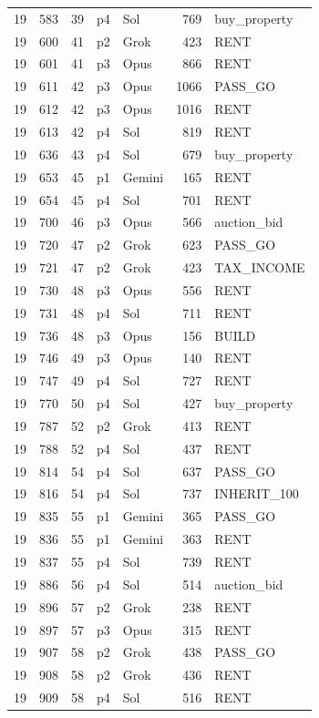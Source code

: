 \begin{longtable}{r r r l l r >{\ttfamily}l}
19 & 583 & 39 & p4 & Sol & 769 & buy\_property \\
19 & 600 & 41 & p2 & Grok & 423 & RENT \\
19 & 601 & 41 & p3 & Opus & 866 & RENT \\
19 & 611 & 42 & p3 & Opus & 1066 & PASS\_GO \\
19 & 612 & 42 & p3 & Opus & 1016 & RENT \\
19 & 613 & 42 & p4 & Sol & 819 & RENT \\
19 & 636 & 43 & p4 & Sol & 679 & buy\_property \\
19 & 653 & 45 & p1 & Gemini & 165 & RENT \\
19 & 654 & 45 & p4 & Sol & 701 & RENT \\
19 & 700 & 46 & p3 & Opus & 566 & auction\_bid \\
19 & 720 & 47 & p2 & Grok & 623 & PASS\_GO \\
19 & 721 & 47 & p2 & Grok & 423 & TAX\_INCOME \\
19 & 730 & 48 & p3 & Opus & 556 & RENT \\
19 & 731 & 48 & p4 & Sol & 711 & RENT \\
19 & 736 & 48 & p3 & Opus & 156 & BUILD \\
19 & 746 & 49 & p3 & Opus & 140 & RENT \\
19 & 747 & 49 & p4 & Sol & 727 & RENT \\
19 & 770 & 50 & p4 & Sol & 427 & buy\_property \\
19 & 787 & 52 & p2 & Grok & 413 & RENT \\
19 & 788 & 52 & p4 & Sol & 437 & RENT \\
19 & 814 & 54 & p4 & Sol & 637 & PASS\_GO \\
19 & 816 & 54 & p4 & Sol & 737 & INHERIT\_100 \\
19 & 835 & 55 & p1 & Gemini & 365 & PASS\_GO \\
19 & 836 & 55 & p1 & Gemini & 363 & RENT \\
19 & 837 & 55 & p4 & Sol & 739 & RENT \\
19 & 886 & 56 & p4 & Sol & 514 & auction\_bid \\
19 & 896 & 57 & p2 & Grok & 238 & RENT \\
19 & 897 & 57 & p3 & Opus & 315 & RENT \\
19 & 907 & 58 & p2 & Grok & 438 & PASS\_GO \\
19 & 908 & 58 & p2 & Grok & 436 & RENT \\
19 & 909 & 58 & p4 & Sol & 516 & RENT \\

\end{longtable}
